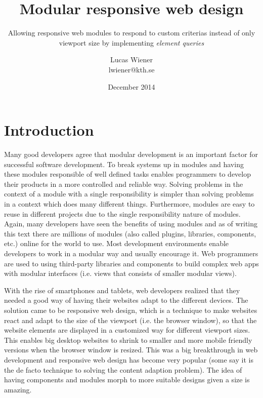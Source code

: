 \documentclass[oneside,a4paper,11pt]{kth-mag}
\title{Modular responsive web design}
\subtitle{Allowing responsive web modules to respond to custom criterias instead of only viewport size by implementing \emph{element queries}}
\author{Lucas Wiener \\ \lowercase{lwiener@kth.se}}
\date{December 2014}
\begin{document}
\frontmatter
\pagestyle{empty}
\removepagenumbers
\maketitle
\mainmatter
\section*{Introduction}

Many good developers agree that modular development is an important factor for successful software development. To break systems up in modules and having these modules responsible of well defined tasks enables programmers to develop their products in a more controlled and reliable way. Solving problems in the context of a module with a single responsibility is simpler than solving problems in a context which does many different things. Furthermore, modules are easy to reuse in different projects due to the single responsibility nature of modules. Again, many developers have seen the benefits of using modules and as of writing this text there are millions of modules (also called plugins, libraries, components, etc.) online for the world to use. Most development environments enable developers to work in a modular way and usually encourage it. Web programmers are used to using third-party libraries and components to build complex web apps with modular interfaces (i.e. views that consists of smaller modular views).

With the rise of smartphones and tablets, web developers realized that they needed a good way of having their websites adapt to the different devices. The solution came to be responsive web design, which is a technique to make websites react and adapt to the size of the viewport (i.e. the browser window), so that the website elements are displayed in a customized way for different viewport sizes. This enables big desktop websites to shrink to smaller and more mobile friendly versions when the browser window is resized. This was a big breakthrough in web development and responsive web design has become very popular (some say it is the de facto technique to solving the content adaption problem). The idea of having components and modules morph to more suitable designs given a size is amazing.
\end{document}
